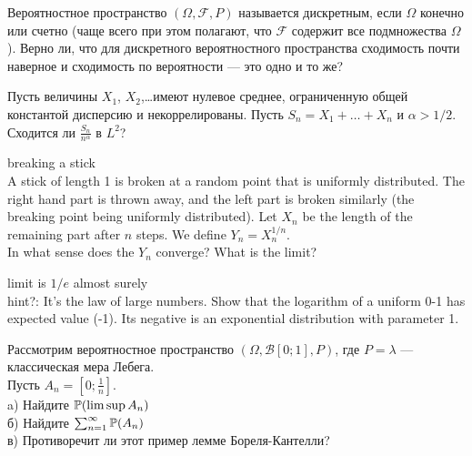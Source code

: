 \begin{solution}
\begin{solution}
\begin{solution}
\begin{solution}
\begin{solution}
\end{solution}

\begin{problem}
Вероятностное пространство $(\Omega,\mathcal{F},P)$ называется
дискретным, если $\Omega$ конечно или счетно (чаще всего при этом
полагают, что $\mathcal{F}$ содержит все подмножества $\Omega$).
Верно ли, что для дискретного вероятностного пространства
сходимость почти наверное и сходимость по вероятности --- это одно и
то же? 
\end{problem} 
\begin{solution} 

\end{solution}

\begin{problem}
Пусть величины $X_{1}$, $X_{2}$,\ldots имеют нулевое среднее, ограниченную общей константой дисперсию и некоррелированы. Пусть $S_{n}=X_{1}+\ldots+X_{n}$ и $\alpha>1/2$.\\
Сходится ли $\frac{S_{n}}{n^{\alpha}}$ в $L^{2}$? 
\end{problem} 
\begin{solution} 

\end{solution}

\begin{problem}
 breaking a stick \\
A stick of length 1 is broken at a random point that is uniformly distributed. The right hand part is thrown away, and the left part is broken similarly (the breaking point being uniformly distributed). Let $X_{n}$ be the length of the remaining part after $n$ steps. We define $Y_{n}=X_{n}^{1/n}$. \\
In what sense does the $Y_{n}$ converge? What is the limit? 
\end{problem} 
\begin{solution} 

limit is $1/e$ almost surely \\
hint?: It's the law of large numbers. Show that the logarithm of a uniform 0-1 has expected value (-1). Its negative is an exponential distribution with parameter 1. 
\end{solution}

\begin{problem}
Рассмотрим вероятностное пространство
$(\Omega,\mathcal{B}[0;1],P)$, где $P=\lambda$ --- классическая
мера Лебега.\\
Пусть $A_{n}=[0;\frac{1}{n}]$. \\
a) Найдите $\P(\limsup A_{n})$ \\
б) Найдите $\sum_{n=1}^{\infty}\P(A_{n})$ \\
в) Противоречит ли этот пример лемме Бореля-Кантелли? 
\end{problem} 
\begin{solution} 


\end{solution}
\end{solution}
\end{solution}
\end{solution}
\end{solution}
